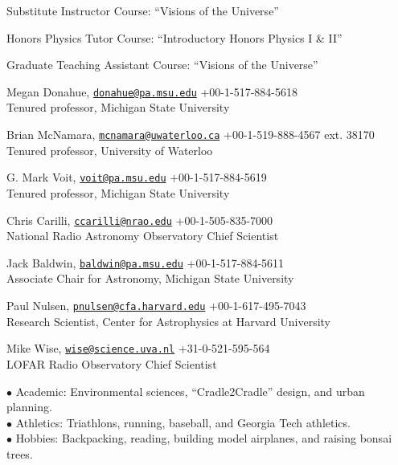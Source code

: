 \documentclass[11pt]{cv}
\begin{document}
\begin{llist}
Substitute Instructor
Course: ``Visions of the Universe''

Honors Physics Tutor
Course: ``Introductory Honors Physics I \& II''

Graduate Teaching Assistant
Course: ``Visions of the Universe''




Megan Donahue, \href{mailto:donahue@pa.msu.edu}{\tt donahue@pa.msu.edu} \hfill +00-1-517-884-5618\\
Tenured professor, Michigan State University

Brian McNamara, \href{mailto:mcnamara@uwaterloo.ca}{\tt mcnamara@uwaterloo.ca} \hfill +00-1-519-888-4567 ext. 38170\\
Tenured professor, University of Waterloo

G. Mark Voit, \href{mailto:voit@pa.msu.edu}{\tt voit@pa.msu.edu} \hfill +00-1-517-884-5619\\
Tenured professor, Michigan State University

Chris Carilli, \href{mailto:ccarilli@nrao.edu}{\tt ccarilli@nrao.edu} \hfill +00-1-505-835-7000\\
National Radio Astronomy Observatory Chief Scientist

Jack Baldwin, \href{mailto:baldwin@pa.msu.edu}{\tt baldwin@pa.msu.edu} \hfill +00-1-517-884-5611\\
Associate Chair for Astronomy, Michigan State University

Paul Nulsen, \href{mailto:pnulsen@cfa.harvard.edu}{\tt pnulsen@cfa.harvard.edu} \hfill +00-1-617-495-7043\\
Research Scientist, Center for Astrophysics at Harvard University

Mike Wise, \href{mailto:wise@science.uva.nl}{\tt wise@science.uva.nl} \hfill +31-0-521-595-564\\
LOFAR Radio Observatory Chief Scientist


$\bullet$ Academic: Environmental sciences, ``Cradle2Cradle'' design, and urban planning.\\
$\bullet$ Athletics: Triathlons, running, baseball, and Georgia Tech athletics.\\
$\bullet$ Hobbies: Backpacking, reading, building model airplanes, and raising bonsai trees.

\end{llist}
\end{document}

